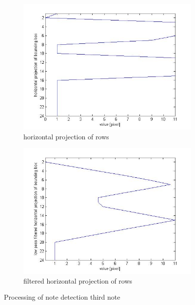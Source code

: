 \begin{figure}
\begin{subfigure}[c]{0.4\textwidth}
        \includegraphics[width=\textwidth]{3e.jpg}
        \caption{horizontal projection of rows}
  \end{subfigure}
  \begin{subfigure}[c]{0.4\textwidth}
        \includegraphics[width=\textwidth]{3f.jpg}
        \caption{filtered horizontal projection of rows}
  \end{subfigure}
	\caption{Processing of note detection third note}
	\label{fig:noteValues3}
\end{figure}


